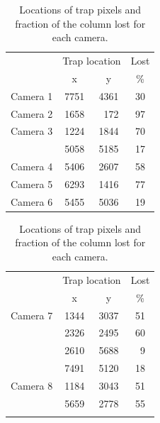 \begin{colsection}
\begin{colsection}
\begin{table}[t]
    \begin{center}
        \begin{tabular}{c|ccc} %
             & \multicolumn{2}{c}{Trap location} & Lost \\
             & x & y & \% \\
            \midrule
            Camera 1 & 7751 & 4361 & 30 \\
            Camera 2 & 1658 & ~172 & 97 \\ %
            Camera 3 & 1224 & 1844 & 70 \\
                     & 5058 & 5185 & 17 \\
            Camera 4 & 5406 & 2607 & 58 \\
            Camera 5 & 6293 & 1416 & 77 \\
            Camera 6 & 5455 & 5036 & 19 \\
        \end{tabular}
        \hspace{0.5cm}
        \begin{tabular}{c|ccc} %
            & \multicolumn{2}{c}{Trap location} & Lost \\
            & x & y & \% \\
            \midrule
            Camera 7 & 1344 & 3037 & 51 \\
                     & 2326 & 2495 & 60 \\
                     & 2610 & 5688 & ~9 \\ %
                     & 7491 & 5120 & 18 \\
            Camera 8 & 1184 & 3043 & 51 \\
                     & 5659 & 2778 & 55 \\
            \multicolumn{4}{c}{} \\
        \end{tabular}
    \end{center}
    \caption[Locations of trap pixels]{
        Locations of trap pixels and fraction of the column lost for each camera.
    }\label{tab:traps}
\end{table}


\end{colsection}
\end{colsection}
